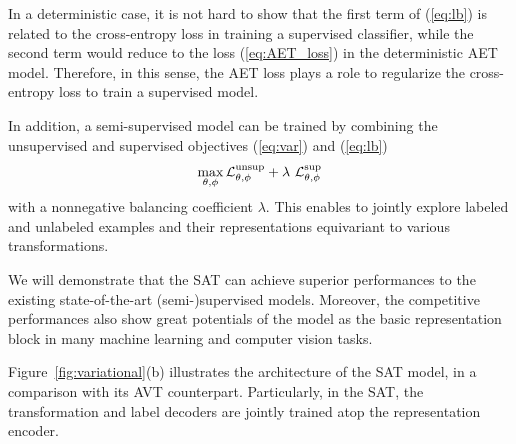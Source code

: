 \documentclass[10pt,journal,compsoc,twoside]{IEEEtran}
\begin{document}
In a deterministic case, it is not hard to show that the first term of (\ref{eq:lb}) is related to the cross-entropy loss in training a supervised classifier, while the second term would reduce to the loss (\ref{eq:AET_loss}) in the deterministic AET model. Therefore, in this sense, the AET loss plays a role to regularize the  cross-entropy loss to train a supervised model.


In addition, a semi-supervised model can be trained by combining the unsupervised and supervised objectives (\ref{eq:var}) and (\ref{eq:lb})
\begin{equation}\label{eq:semi}
\max\limits_{\theta,\phi}
\mathcal L^{\rm unsup}_{\theta,\phi} + \lambda~\mathcal L^{\rm sup}_{\theta,\phi}
\end{equation}
with a nonnegative balancing coefficient $\lambda$. This enables to jointly explore labeled and unlabeled examples and their representations equivariant to various transformations.

We will demonstrate that the SAT can achieve superior performances to the existing state-of-the-art (semi-)supervised models. Moreover, the competitive performances also show great potentials of the model as the basic representation block in many machine learning and computer vision tasks.


Figure~\ref{fig:variational}(b) illustrates the architecture of the SAT model, in a comparison with its AVT counterpart. Particularly, in the SAT, the transformation and label decoders are jointly trained atop the representation encoder.

%
%
\end{document}

